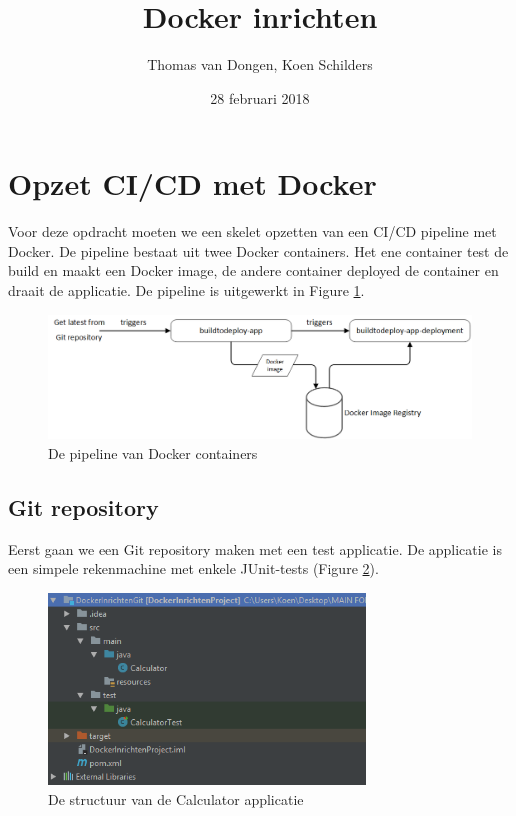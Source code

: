 \documentclass[12pt]{article}
\title{Docker inrichten}
\author{Thomas van Dongen, Koen Schilders}
\date{28 februari 2018}
\begin{document}
\begin{titlepage}
\maketitle
\end{titlepage}



\section{Opzet CI/CD met Docker}
Voor deze opdracht moeten we een skelet opzetten van een CI/CD pipeline met Docker. De pipeline bestaat uit twee Docker containers. Het ene container test de build en maakt een Docker image, de andere container deployed de container en draait de applicatie. De pipeline is uitgewerkt in Figure \ref{fig:cicd_pipeline}.
\newline
\begin{figure}[H]
	\includegraphics[width=\textwidth]{images/DockerPipeline.png}
	\caption{De pipeline van Docker containers\label{fig:cicd_pipeline}}
\end{figure}

\subsection{Git repository}
Eerst gaan we een Git repository maken met een test applicatie. De applicatie is een simpele rekenmachine met enkele JUnit-tests (Figure \ref{fig:calculator_app}).

\begin{figure}[H]
	\begin{center}
		\includegraphics[width=0.75\textwidth]{images/CalculatorApplication.png}
		\caption{De structuur van de Calculator applicatie\label{fig:calculator_app}}
	\end{center}
\end{figure}
\end{document}
